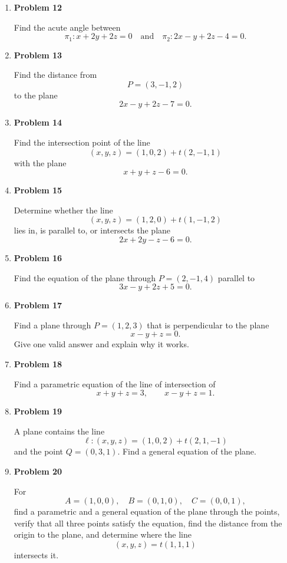 \begin{enumerate}
\item \textbf{Problem 12}\par
Find the acute angle between
\[
\pi_1:x+2y+2z=0
\quad\text{and}\quad
\pi_2:2x-y+2z-4=0.
\]

\item \textbf{Problem 13}\par
Find the distance from
\[
P=(3,-1,2)
\]
to the plane
\[
2x-y+2z-7=0.
\]

\item \textbf{Problem 14}\par
Find the intersection point of the line
\[
(x,y,z)=(1,0,2)+t(2,-1,1)
\]
with the plane
\[
x+y+z-6=0.
\]

\item \textbf{Problem 15}\par
Determine whether the line
\[
(x,y,z)=(1,2,0)+t(1,-1,2)
\]
lies in, is parallel to, or intersects the plane
\[
2x+2y-z-6=0.
\]

\item \textbf{Problem 16}\par
Find the equation of the plane through \(P=(2,-1,4)\) parallel to
\[
3x-y+2z+5=0.
\]

\item \textbf{Problem 17}\par
Find a plane through \(P=(1,2,3)\) that is perpendicular to the plane
\[
x-y+z=0.
\]
Give one valid answer and explain why it works.

\item \textbf{Problem 18}\par
Find a parametric equation of the line of intersection of
\[
x+y+z=3,
\qquad
x-y+z=1.
\]

\item \textbf{Problem 19}\par
A plane contains the line
\[
\ell:(x,y,z)=(1,0,2)+t(2,1,-1)
\]
and the point \(Q=(0,3,1)\). Find a general equation of the plane.

\item \textbf{Problem 20}\par
For
\[
A=(1,0,0),\quad B=(0,1,0),\quad C=(0,0,1),
\]
find a parametric and a general equation of the plane through the points, verify that all three points satisfy the equation, find the distance from the origin to the plane, and determine where the line
\[
(x,y,z)=t(1,1,1)
\]
intersects it.
\end{enumerate}
